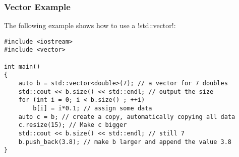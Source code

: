 

\begin{frame}[fragile]
\frametitle{Vector Example}
The following example shows how to use a \inline!std::vector!:
\begin{lstlisting}
#include <iostream>
#include <vector>

int main()
{
    auto b = std::vector<double>(7); // a vector for 7 doubles
    std::cout << b.size() << std::endl; // output the size
    for (int i = 0; i < b.size() ; ++i)
        b[i] = i*0.1; // assign some data
    auto c = b; // create a copy, automatically copying all data
    c.resize(15); // Make c bigger
    std::cout << b.size() << std::endl; // still 7
    b.push_back(3.8); // make b larger and append the value 3.8
}
\end{lstlisting}
\end{frame}

